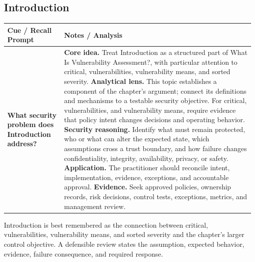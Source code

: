 \documentclass[11pt]{article}
\newcommand{\CornellHeader}{%
\rowcolor{Navy}\color{white}\bfseries Cue / Recall Prompt & \color{white}\bfseries Notes / Analysis\\\hline}
\newcommand{\CornellRow}[2]{%
\cellcolor{CueGray}\RaggedRight\textbf{#1} & \RaggedRight #2\\\hline}
\begin{document}
\subsection*{Introduction}
\begin{longtable}{>{\RaggedRight\arraybackslash}p{}|>{\RaggedRight\arraybackslash}p{}}
\CornellHeader
\CornellRow{What security problem does Introduction address?}{\textbf{Core idea.} Treat Introduction as a structured part of What Is Vulnerability Assessment?, with particular attention to critical, vulnerabilities, vulnerability means, and sorted severity. \textbf{Analytical lens.} This topic establishes a component of the chapter's argument; connect its definitions and mechanisms to a testable security objective. For critical, vulnerabilities, and vulnerability means, require evidence that policy intent changes decisions and operating behavior. \textbf{Security reasoning.} Identify what must remain protected, who or what can alter the expected state, which assumptions cross a trust boundary, and how failure changes confidentiality, integrity, availability, privacy, or safety. \textbf{Application.} The practitioner should reconcile intent, implementation, evidence, exceptions, and accountable approval. \textbf{Evidence.} Seek approved policies, ownership records, risk decisions, control tests, exceptions, metrics, and management review.}
\end{longtable}
\begin{topicsummary}
Introduction is best remembered as the connection between critical, vulnerabilities, vulnerability means, and sorted severity and the chapter's larger control objective. A defensible review states the assumption, expected behavior, evidence, failure consequence, and required response.
\end{topicsummary}
\end{document}
